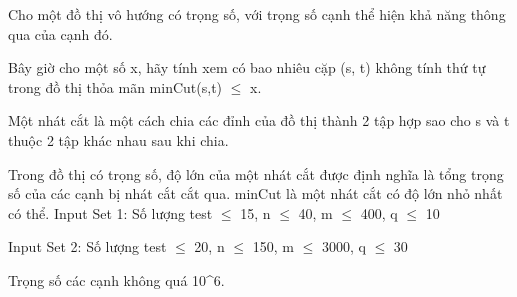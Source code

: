 Cho một đồ thị vô hướng có trọng số, với trọng số cạnh thể hiện khả năng thông qua của cạnh đó.  

   Bây giờ cho một số x, hãy tính xem có bao nhiêu cặp (s, t) không tính thứ tự trong đồ thị thỏa mãn minCut(s,t)  $\le$  x.  

   Một nhát cắt là một cách chia các đỉnh của đồ thị thành 2 tập hợp sao cho s và t thuộc 2 tập khác nhau sau khi chia.  

   Trong đồ thị có trọng số, độ lớn của một nhát cắt được định nghĩa là tổng trọng số của các cạnh bị nhát cắt cắt qua. minCut là một nhát cắt có độ lớn nhỏ nhất có thể.
Input Set 1: Số lượng test  $\le$  15, n  $\le$  40, m  $\le$  400, q  $\le$  10  

   Input Set 2: Số lượng test  $\le$  20, n  $\le$  150, m  $\le$  3000, q  $\le$  30  

   Trọng số các cạnh không quá 10^6.